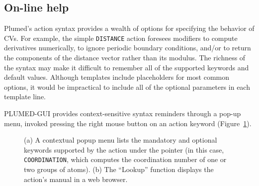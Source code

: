 \documentclass[preprint,12pt]{elsarticle}
\begin{document}
\subsection{On-line help}

Plumed's action syntax provides a wealth of options for specifying the
behavior of CVs. For example, the simple \texttt{DISTANCE} action
foresees modifiers to compute derivatives numerically, to ignore
periodic boundary conditions, and/or to return the components of the
distance vector rather than its modulus. The richness of the syntax
may make it difficult to remember all of the supported keywords and
default values.  Although templates include placeholders for most
common options, it would be impractical to include all of the optional
parameters in each template line.

PLUMED-GUI provides context-sensitive syntax reminders through a
pop-up menu, invoked pressing the right mouse button on an action
keyword (Figure~\ref{fig:help}).


\begin{figure}
  \centering
  \caption{(a) A contextual popup menu lists the mandatory and
    optional keywords supported by the action under the pointer (in
    this case, \texttt{COORDINATION}, which computes the coordination
    number of one or two groups of atoms). (b) The ``Lookup'' function
    displays the action's manual in a web browser. }
  \label{fig:help}
\end{figure}
\end{document}

